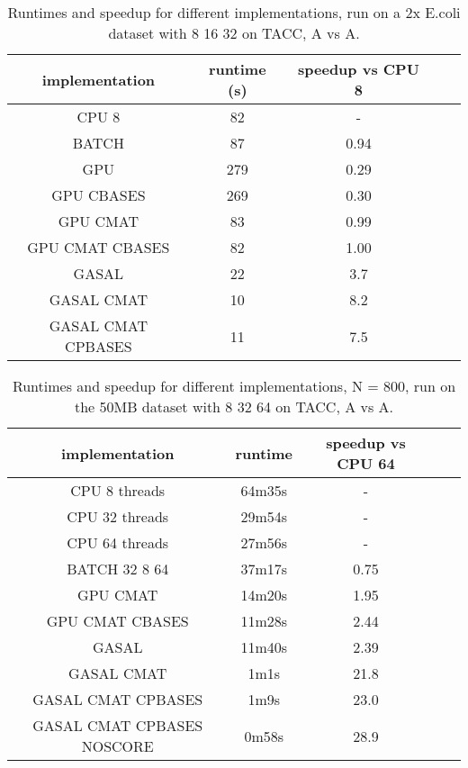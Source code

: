 \documentclass[../thesis.tex]{subfiles}
\begin{document}
\begin{table}
\centering
\caption{Runtimes and speedup for different implementations, run on a 2x E.coli dataset with 8 16 32 on TACC, A vs A.}
\label{tbl:darwin1}
\begin{tabular}{c c c c c}
implementation & runtime (s) & speedup vs CPU 8 \\ \hline
CPU 8 & 82 & -\\
BATCH & 87 & 0.94 \\
GPU & 279 & 0.29 \\
GPU CBASES & 269 & 0.30 \\
GPU CMAT & 83 & 0.99 \\
GPU CMAT CBASES & 82 & 1.00 \\
GASAL & 22 & 3.7 \\
GASAL CMAT & 10 & 8.2 \\
GASAL CMAT CPBASES & 11 & 7.5 \\
\end{tabular}
\end{table}

\begin{table}
\centering
\caption{Runtimes and speedup for different implementations, N = 800, run on the 50MB dataset with 8 32 64 on TACC, A vs A.}
\label{tbl:darwin2}
\begin{tabular}{c c c c c}
implementation & runtime & speedup vs CPU 64 \\ \hline
CPU 8 threads & 64m35s & - \\
CPU 32 threads & 29m54s & - \\
CPU 64 threads & 27m56s & - \\
BATCH 32 8 64 & 37m17s & 0.75 \\
GPU CMAT & 14m20s & 1.95 \\
GPU CMAT CBASES & 11m28s & 2.44 \\
GASAL & 11m40s & 2.39 \\
GASAL CMAT & 1m1s & 21.8 \\
GASAL CMAT CPBASES & 1m9s & 23.0 \\
GASAL CMAT CPBASES NOSCORE & 0m58s & 28.9 \\
\end{tabular}
\end{table}

\end{document}
